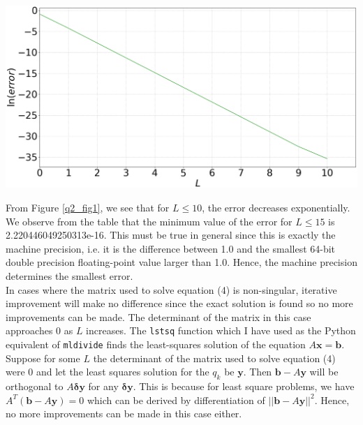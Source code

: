 \documentclass[12pt, a4paper]{article}
\begin{document}
\begin{minipage}{\textwidth}
	\includegraphics[width=\linewidth]{q2_fig1}

	\vspace*{-0.2cm}

	\label{q2_fig1}
\end{minipage}
\vspace{0.3cm}

From Figure \ref{q2_fig1}, we see that for $L \leq 10$, the error 
decreases exponentially. We observe from the table that the minimum 
value of the error for $L \leq 15$ is 2.220446049250313e-16.
This must be true in general since this is exactly the machine precision, 
i.e. it is the  difference between 1.0 and the smallest 64-bit double 
precision floating-point value larger than 1.0. Hence, the machine precision 
determines the smallest error.
\\

In cases where the matrix used to solve equation (4) is non-singular, 
iterative improvement will make no difference since the exact solution 
is found so no more improvements can be made. The determinant of the 
matrix in this case approaches 0 as $L$ increases. The \texttt{lstsq}
function which I have used as the Python equivalent of \texttt{mldivide} 
finds the least-squares solution of the equation $A\mathbf{x} = \mathbf{b}$. 
Suppose for some $L$ the determinant of the matrix used to solve equation 
(4) were 0 and let the least squares solution for the $q_{k}$ be 
$\mathbf{y}$. Then $\mathbf{b}-A\mathbf{y}$ will be orthogonal to
$A\mathbf{\delta y}$ for any $\mathbf{\delta y}$. This is because
for least square problems, we have $A^{T}(\mathbf{b}-A\mathbf{y}) = 0$ 
which can be derived by differentiation of $||\mathbf{b}-A\mathbf{y}||^{2}$. 
Hence, no more improvements can be made in this case either.
\\
\end{document}
